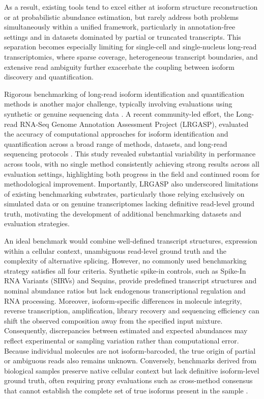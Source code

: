As a result, existing tools tend to excel either at isoform structure reconstruction or at probabilistic abundance estimation, but rarely address both problems simultaneously within a unified framework, particularly in annotation-free settings and in datasets dominated by partial or truncated transcripts. This separation becomes especially limiting for single-cell and single-nucleus long-read transcriptomics, where sparse coverage, heterogeneous transcript boundaries, and extensive read ambiguity further exacerbate the coupling between isoform discovery and quantification.

Rigorous benchmarking of long-read isoform identification and quantification methods is another major challenge, typically involving evaluations using synthetic or genuine sequencing data \citep{su2024, pardopalacios2024b, dong2023}. A recent community-led effort, the Long-read RNA-Seq Genome Annotation Assessment Project (LRGASP), evaluated the accuracy of computational approaches for isoform identification and quantification across a broad range of methods, datasets, and long-read sequencing protocols \citep{pardopalacios2024b}. This study revealed substantial variability in performance across tools, with no single method consistently achieving strong results across all evaluation settings, highlighting both progress in the field and continued room for methodological improvement. Importantly, LRGASP also underscored limitations of existing benchmarking substrates, particularly those relying exclusively on simulated data or on genuine transcriptomes lacking definitive read-level ground truth, motivating the development of additional benchmarking datasets and evaluation strategies.

An ideal benchmark would combine well-defined transcript structures, expression within a cellular context, unambiguous read-level ground truth and the complexity of alternative splicing. However, no commonly used benchmarking strategy satisfies all four criteria. Synthetic spike-in controls, such as Spike-In RNA Variants (SIRVs) and Sequins, provide predefined transcript structures and nominal abundance ratios but lack endogenous transcriptional regulation and RNA processing. Moreover, isoform-specific differences in molecule integrity, reverse transcription, amplification, library recovery and sequencing efficiency can shift the observed composition away from the specified input mixture. Consequently, discrepancies between estimated and expected abundances may reflect experimental or sampling variation rather than computational error. Because individual molecules are not isoform-barcoded, the true origin of partial or ambiguous reads also remains unknown. Conversely, benchmarks derived from biological samples preserve native cellular context but lack definitive isoform-level ground truth, often requiring proxy evaluations such as cross-method consensus that cannot establish the complete set of true isoforms present in the sample \citep{steijger2013, pardopalacios2024b}.

